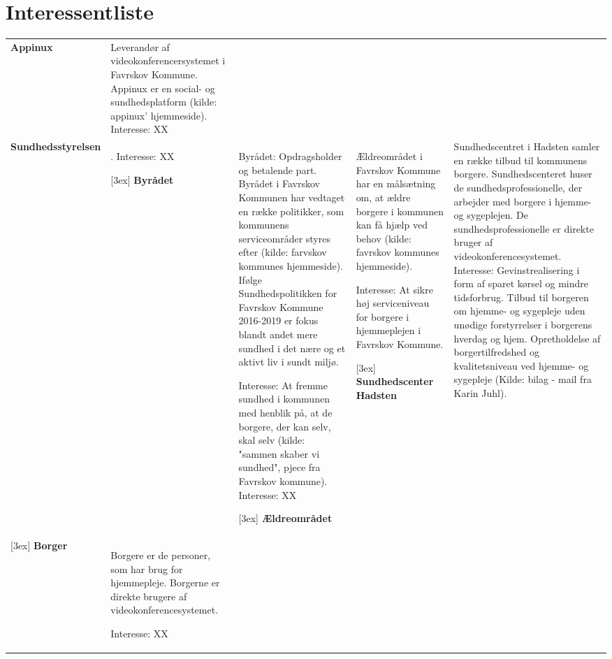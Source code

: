 \documentclass[10pt,a4paper]{article}
\begin{document}
\section{Interessentliste}

\begin{table}[H]
\begin{tabularx}{\linewidth}{lX}

\textbf{Appinux} & Leverandør af videokonferencersystemet i Favrskov Kommune. Appinux er en social- og sundhedsplatform (kilde: appinux' hjemmeside).
Interesse: XX\\

\textbf{Sundhedsstyrelsen} & .
Interesse: XX


[3ex]
\textbf{Byrådet} & 
Byrådet: Opdragsholder og betalende part. Byrådet i Favrskov Kommunen har vedtaget en række politikker, som kommunens serviceområder styres efter (kilde: farvskov kommunes hjemmeside).
Ifølge Sundhedspolitikken for Favrskov Kommune 2016-2019 er fokus blandt andet mere sundhed i det nære og et aktivt liv i sundt miljø. 

Interesse: At fremme sundhed i kommunen med henblik på, at de borgere, der kan selv, skal selv (kilde: "sammen skaber vi sundhed", pjece fra Favrskov kommune). 
Interesse: XX

[3ex]
\textbf{Ældreområdet} & Ældreområdet i Favrskov Kommune har en målsætning om, at ældre borgere i kommunen kan få hjælp ved behov (kilde: favrskov kommunes hjemmeside). 


Interesse: At sikre høj serviceniveau for borgere i hjemmeplejen i Favrskov Kommune. 

[3ex]
\textbf{Sundhedscenter Hadsten} & Sundhedscentret i Hadsten samler en række tilbud til kommunens borgere. Sundhedscenteret huser de sundhedsprofessionelle, der arbejder med borgere i hjemme- og sygeplejen. De sundhedsprofessionelle er direkte bruger af videokonferencesystemet.
Interesse: Gevinstrealisering i form af sparet kørsel og mindre tidsforbrug. Tilbud til borgeren om hjemme- og sygepleje uden unødige forstyrrelser i borgerens hverdag og hjem. Opretholdelse af borgertilfredshed og kvalitetsniveau ved hjemme- og sygepleje (Kilde: bilag - mail fra Karin Juhl).


\\

[3ex]
\textbf{Borger} & Borgere er de personer, som har brug for hjemmepleje. Borgerne er direkte brugere af videokonferencesystemet.


Interesse: XX 


\end{tabularx}
\end{table}
\end{document}
